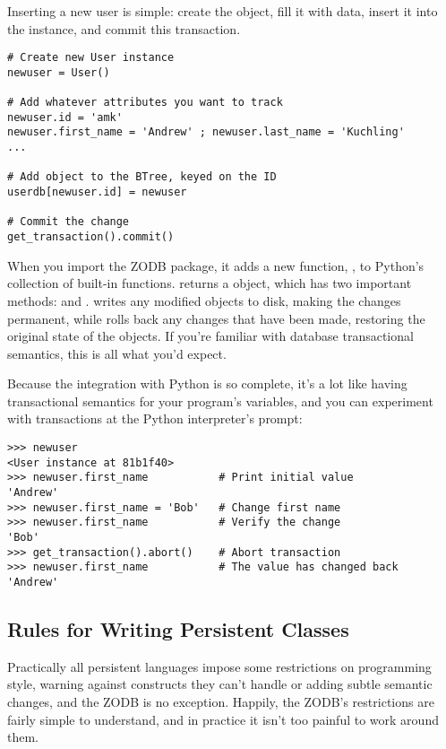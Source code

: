 Inserting a new user is simple: create the  object, fill
it with data, insert it into the  instance, and commit
this transaction.

\begin{verbatim}# Create new User instance
newuser = User() 

# Add whatever attributes you want to track
newuser.id = 'amk' 
newuser.first_name = 'Andrew' ; newuser.last_name = 'Kuchling'
...

# Add object to the BTree, keyed on the ID
userdb[newuser.id] = newuser

# Commit the change
get_transaction().commit()
\end{verbatim}

When you import the ZODB package, it adds a new function,
, to Python's collection of built-in
functions.   returns a 
object, which has two important methods:  and
.   writes any modified objects
to disk, making the changes permanent, while  rolls
back any changes that have been made, restoring the original state of
the objects.  If you're familiar with database transactional
semantics, this is all what you'd expect.

Because the integration with Python is so complete, it's a lot like
having transactional semantics for your program's variables, and you
can experiment with transactions at the Python interpreter's prompt:

\begin{verbatim}>>> newuser
<User instance at 81b1f40>
>>> newuser.first_name           # Print initial value
'Andrew'         
>>> newuser.first_name = 'Bob'   # Change first name
>>> newuser.first_name           # Verify the change
'Bob'
>>> get_transaction().abort()    # Abort transaction
>>> newuser.first_name           # The value has changed back
'Andrew'
\end{verbatim}

\subsection{Rules for Writing Persistent Classes}

Practically all persistent languages impose some restrictions on
programming style, warning against constructs they can't handle or
adding subtle semantic changes, and the ZODB is no exception.
Happily, the ZODB's restrictions are fairly simple to understand, and
in practice it isn't too painful to work around them.

